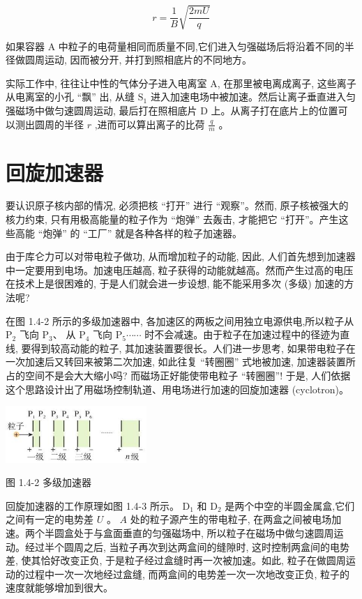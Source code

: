 \documentclass[10pt]{article}
\begin{document}
\[
r = \frac{1}{B}\sqrt{\frac{2mU}{q}}
\]

如果容器 \(\mathrm{A}\) 中粒子的电荷量相同而质量不同,它们进入匀强磁场后将沿着不同的半径做圆周运动, 因而被分开, 并打到照相底片的不同地方。

实际工作中, 往往让中性的气体分子进入电离室 A, 在那里被电离成离子, 这些离子从电离室的小孔 “飘” 出, 从缝 \({\mathrm{S}}_{1}\) 进入加速电场中被加速。然后让离子垂直进入匀强磁场中做匀速圆周运动, 最后打在照相底片 \(\mathrm{D}\) 上。从离子打在底片上的位置可以测出圆周的半径 \(r\) ,进而可以算出离子的比荷 \(\frac{q}{m}\) 。

\section*{回旋加速器}

要认识原子核内部的情况, 必须把核 “打开” 进行 “观察”。然而, 原子核被强大的核力约束, 只有用极高能量的粒子作为 “炮弹” 去轰击, 才能把它 “打开”。产生这些高能 “炮弹” 的 “工厂” 就是各种各样的粒子加速器。

由于库仑力可以对带电粒子做功, 从而增加粒子的动能, 因此, 人们首先想到加速器中一定要用到电场。加速电压越高, 粒子获得的动能就越高。然而产生过高的电压在技术上是很困难的, 于是人们就会进一步设想, 能不能采用多次 (多级) 加速的方法呢?

在图 1.4-2 所示的多级加速器中, 各加速区的两板之间用独立电源供电,所以粒子从 \({\mathrm{P}}_{2}\) 飞向 \({\mathrm{P}}_{3}\text{、}\) 从 \({\mathrm{P}}_{4}\) 飞向 \({\mathrm{P}}_{5}\cdots \cdots\) 时不会减速。由于粒子在加速过程中的径迹为直线, 要得到较高动能的粒子, 其加速装置要很长。人们进一步思考, 如果带电粒子在一次加速后又转回来被第二次加速, 如此往复 “转圈圈” 式地被加速, 加速器装置所占的空间不是会大大缩小吗? 而磁场正好能使带电粒子 “转圈圈”! 于是, 人们依据这个思路设计出了用磁场控制轨道、用电场进行加速的回旋加速器 (cyclotron)。

\begin{center}
\includegraphics[max width=0.4\textwidth]{images/01910e72-c5b7-7ed5-a6d4-fb3a5faefc32_24_218887.jpg}
\end{center}

图 1.4-2 多级加速器

回旋加速器的工作原理如图 1.4-3 所示。 \({\mathrm{D}}_{1}\) 和 \({\mathrm{D}}_{2}\) 是两个中空的半圆金属盒,它们之间有一定的电势差 \(U\) 。 \(A\) 处的粒子源产生的带电粒子, 在两盒之间被电场加速。两个半圆盒处于与盒面垂直的匀强磁场中, 所以粒子在磁场中做匀速圆周运动。经过半个圆周之后, 当粒子再次到达两盒间的缝隙时, 这时控制两盒间的电势差, 使其恰好改变正负, 于是粒子经过盒缝时再一次被加速。如此, 粒子在做圆周运动的过程中一次一次地经过盒缝, 而两盒间的电势差一次一次地改变正负, 粒子的速度就能够增加到很大。
\end{document}

